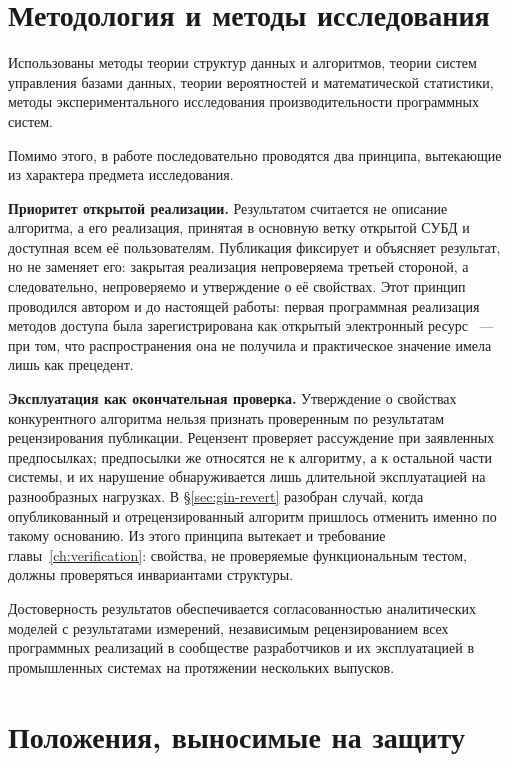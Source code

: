 \section*{Методология и методы исследования}

Использованы методы теории структур данных и алгоритмов, теории систем
управления базами данных, теории вероятностей и математической статистики,
методы экспериментального исследования производительности программных систем.

Помимо этого, в работе последовательно проводятся два принципа, вытекающие из
характера предмета исследования.

\textbf{Приоритет открытой реализации.} Результатом считается не описание
алгоритма, а его реализация, принятая в основную ветку открытой СУБД и
доступная всем её пользователям. Публикация фиксирует и объясняет результат,
но не заменяет его: закрытая реализация непроверяема третьей стороной, а
следовательно, непроверяемо и утверждение о её свойствах. Этот принцип
проводился автором и до настоящей работы: первая программная реализация методов
доступа была зарегистрирована как открытый электронный ресурс
\cite{imkd2009}~--- при том, что распространения она не получила и практическое
значение имела лишь как прецедент.

\textbf{Эксплуатация как окончательная проверка.} Утверждение о свойствах
конкурентного алгоритма нельзя признать проверенным по результатам
рецензирования публикации. Рецензент проверяет рассуждение при заявленных
предпосылках; предпосылки же относятся не к алгоритму, а к остальной части
системы, и их нарушение обнаруживается лишь длительной эксплуатацией на
разнообразных нагрузках. В §\ref{sec:gin-revert} разобран случай, когда
опубликованный и отрецензированный алгоритм пришлось отменить именно по такому
основанию. Из этого принципа вытекает и требование главы~\ref{ch:verification}:
свойства, не проверяемые функциональным тестом, должны проверяться
инвариантами структуры.

Достоверность результатов обеспечивается согласованностью аналитических
моделей с результатами измерений, независимым рецензированием всех программных
реализаций в сообществе разработчиков \pg{} и их эксплуатацией в промышленных
системах на протяжении нескольких выпусков.

\section*{Положения, выносимые на защиту}

